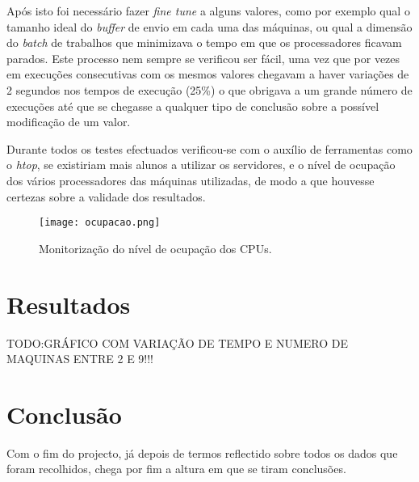\documentclass[a4paper]{article}
\begin{document}
Após isto foi necessário fazer \textit{fine tune} a alguns valores, como por exemplo qual o tamanho ideal do \textit{buffer} de envio em cada uma das máquinas, ou qual a dimensão do \textit{batch} de trabalhos que minimizava o tempo em que os processadores ficavam parados. Este processo nem sempre se verificou ser fácil, uma vez que por vezes em execuções consecutivas com os mesmos valores chegavam a haver variações de 2 segundos nos tempos de execução (25\%) o que obrigava a um grande número de execuções até que se chegasse a qualquer tipo de conclusão sobre a possível modificação de um valor.

Durante todos os testes efectuados verificou-se com o auxílio de ferramentas como o \textit{htop}, se existiriam mais alunos a utilizar os servidores, e o nível de ocupação dos vários processadores das máquinas utilizadas, de modo a que houvesse certezas sobre a validade dos resultados.
\begin{figure}[h]
	\texttt{[image: ocupacao.png]}
	\caption{Monitorização do nível de ocupação dos CPUs.}
\end{figure}
\clearpage


\section{Resultados}
\indent \indent TODO:GRÁFICO COM VARIAÇÃO DE TEMPO E NUMERO DE MAQUINAS ENTRE 2 E 9!!!
\clearpage


\section{Conclusão}
\indent \indent Com o fim do projecto, já depois de termos reflectido sobre todos os dados que foram recolhidos, chega por fim a altura em que se tiram conclusões.


\clearpage
\end{document}
